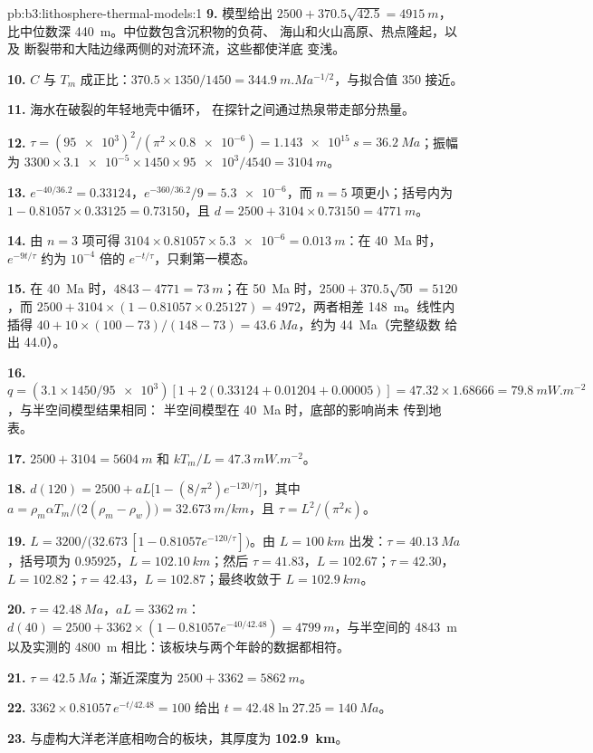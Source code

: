 \begin{solution}{pb:b3:lithosphere-thermal-models:1}
\textbf{9.} 模型给出 $2500 + 370.5\sqrt{42.5} = \qty{4915}{m}$，
比中位数深 \qty{440}{m}。中位数包含沉积物的负荷、
海山和火山高原、热点隆起，以及
断裂带和大陆边缘两侧的对流环流，这些都使洋底
变浅。

\textbf{10.} $C$ 与 $T_m$ 成正比：$370.5\times1350/1450 =
\qty{344.9}{m.Ma^{-1/2}}$，与拟合值 350 接近。

\textbf{11.} 海水在破裂的年轻地壳中循环，
在探针之间通过热泉带走部分热量。

\textbf{12.} $\tau = (\num{95e3})^2/(\pi^2\times\num{0.8e-6}) =
\qty{1.143e15}{s} = \qty{36.2}{Ma}$；振幅为 $3300\times
\num{3.1e-5}\times1450\times\num{95e3}/4540 = \qty{3104}{m}$。

\textbf{13.} $e^{-40/36.2} = 0.33124$，$e^{-360/36.2}/9 = \num{5.3e-6}$，而
$n = 5$ 项更小；括号内为 $1 - 0.81057\times0.33125 =
0.73150$，且 $d = 2500 + 3104\times0.73150 = \qty{4771}{m}$。

\textbf{14.} 由 $n = 3$ 项可得 $3104\times0.81057\times\num{5.3e-6} =
\qty{0.013}{m}$：在 \qty{40}{Ma} 时，$e^{-9t/\tau}$ 约为
$10^{-4}$ 倍的 $e^{-t/\tau}$，只剩第一模态。

\textbf{15.} 在 \qty{40}{Ma} 时，$4843 - 4771 = \qty{73}{m}$；在
\qty{50}{Ma} 时，$2500 + 370.5\sqrt{50} = 5120$，而 $2500 + 3104\times(1 -
0.81057\times0.25127) = 4972$，两者相差 \qty{148}{m}。线性内插得 $40 + 10\times
(100 - 73)/(148 - 73) = \qty{43.6}{Ma}$，约为 \qty{44}{Ma}（完整级数
给出 44.0）。

\textbf{16.} $q = (3.1\times1450/\num{95e3})[1 + 2(0.33124 + 0.01204 +
0.00005)] = 47.32\times1.68666 = \qty{79.8}{mW.m^{-2}}$，与半空间模型结果相同：
半空间模型在 \qty{40}{Ma} 时，底部的影响尚未
传到地表。

\textbf{17.} $2500 + 3104 = \qty{5604}{m}$ 和 $kT_m/L = \qty{47.3}{mW.m^{-2}}$。

\textbf{18.} $d(120) = 2500 + aL\bigl[1 - (8/\pi^2)e^{-120/\tau}\bigr]$，其中
$a = \rho_m\alpha T_m/\bigl(2(\rho_m - \rho_w)\bigr) = \qty{32.673}{m/km}$，且
$\tau = L^2/(\pi^2\kappa)$。

\textbf{19.} $L = 3200/\bigl(32.673\,[1 - 0.81057e^{-120/\tau}]\bigr)$。由
$L = \qty{100}{km}$ 出发：$\tau = \qty{40.13}{Ma}$，括号项为 0.95925，$L =
\qty{102.10}{km}$；然后 $\tau = 41.83$，$L = 102.67$；$\tau = 42.30$，$L =
102.82$；$\tau = 42.43$，$L = 102.87$；最终收敛于 $L = \qty{102.9}{km}$。

\textbf{20.} $\tau = \qty{42.48}{Ma}$，$aL = \qty{3362}{m}$：$d(40) = 2500 +
3362\times(1 - 0.81057e^{-40/42.48}) = \qty{4799}{m}$，与半空间的 \qty{4843}{m}
以及实测的 \qty{4800}{m} 相比：该板块与两个年龄的数据都相符。

\textbf{21.} $\tau = \qty{42.5}{Ma}$；渐近深度为 $2500 + 3362 =
\qty{5862}{m}$。

\textbf{22.} $3362\times0.81057\,e^{-t/42.48} = 100$ 给出 $t = 42.48\ln27.25 =
\qty{140}{Ma}$。

\textbf{23.} 与虚构大洋老洋底相吻合的板块，其厚度为
\textbf{\qty[text-series-to-math=true]{102.9}{km}}。
\end{solution}
